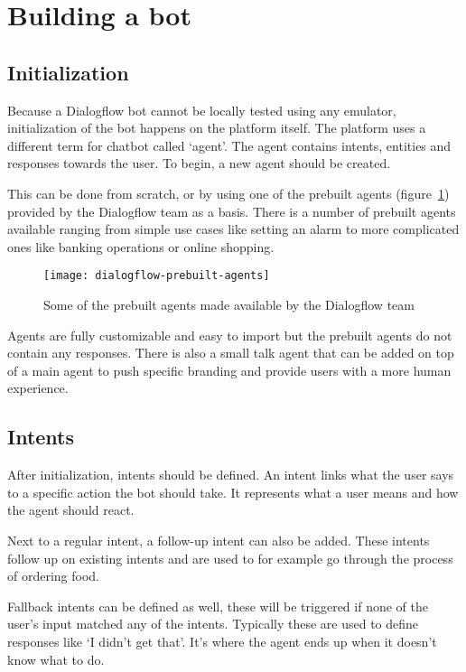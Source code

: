 \clearpage
\newpage

\section{Building a bot}

\subsection{Initialization}

Because a Dialogflow bot cannot be locally tested using any emulator, initialization of the bot happens on the platform itself. The platform uses a different term for chatbot called `agent'. The agent contains intents, entities and responses towards the user. To begin, a new agent should be created.

This can be done from scratch, or by using one of the prebuilt agents (figure~\ref{fig:dialogflow-prebuilt-agents}) provided by the Dialogflow team as a basis. There is a number of prebuilt agents available ranging from simple use cases like setting an alarm to more complicated ones like banking operations or online shopping.

\begin{figure}[ht]
	\centering
	\texttt{[image: dialogflow-prebuilt-agents]}
	\caption{Some of the prebuilt agents made available by the Dialogflow team}
	\label{fig:dialogflow-prebuilt-agents}
\end{figure}

Agents are fully customizable and easy to import but the prebuilt agents do not contain any responses. There is also a small talk agent that can be added on top of a main agent to push specific branding and provide users with a more human experience.

\subsection{Intents}

After initialization, intents should be defined. An intent links what the user says to a specific action the bot should take. It represents what a user means and how the agent should react.

Next to a regular intent, a follow-up intent can also be added. These intents follow up on existing intents and are used to for example go through the process of ordering food.

Fallback intents can be defined as well, these will be triggered if none of the user's input matched any of the intents. Typically these are used to define responses like `I didn't get that'. It's where the agent ends up when it doesn't know what to do.

